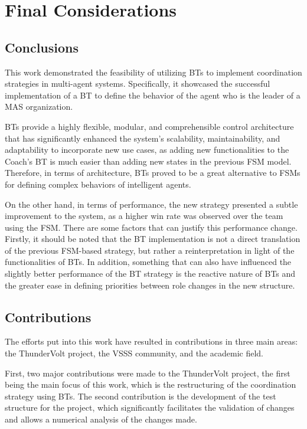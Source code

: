 \chapter{Final Considerations}
\label{ch:final_considerations}

\section{Conclusions}

This work demonstrated the feasibility of utilizing BTs to implement coordination strategies in multi-agent systems. Specifically, it showcased the successful implementation of a BT to define the behavior of the agent who is the leader of a MAS organization.

BTs provide a highly flexible, modular, and comprehensible control architecture that has significantly enhanced the system's scalability, maintainability, and adaptability to incorporate new use cases, as adding new functionalities to the Coach's BT is much easier than adding new states in the previous FSM model. Therefore, in terms of architecture, BTs proved to be a great alternative to FSMs for defining complex behaviors of intelligent agents.

On the other hand, in terms of performance, the new strategy presented a subtle improvement to the system, as a higher win rate was observed over the team using the FSM. There are some factors that can justify this performance change. Firstly, it should be noted that the BT implementation is not a direct translation of the previous FSM-based strategy, but rather a reinterpretation in light of the functionalities of BTs. In addition, something that can also have influenced the slightly better performance of the BT strategy is the reactive nature of BTs and the greater ease in defining priorities between role changes in the new structure.

\section{Contributions}

The efforts put into this work have resulted in contributions in three main areas: the ThunderVolt project, the VSSS community, and the academic field.

First, two major contributions were made to the ThunderVolt project, the first being the main focus of this work, which is the restructuring of the coordination strategy using BTs. The second contribution is the development of the test structure for the project, which significantly facilitates the validation of changes and allows a numerical analysis of the changes made.

